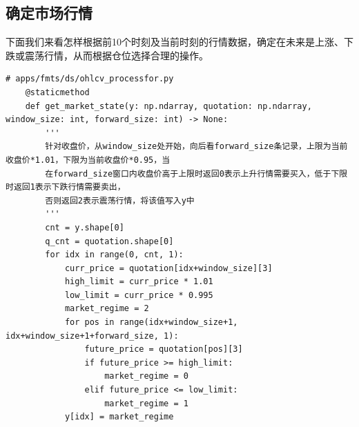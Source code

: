 \subsection{确定市场行情}
下面我们来看怎样根据前10个时刻及当前时刻的行情数据，确定在未来是上涨、下跌或震荡行情，从而根据仓位选择合理的操作。
\begin{lstlisting}
# apps/fmts/ds/ohlcv_processfor.py
    @staticmethod
    def get_market_state(y: np.ndarray, quotation: np.ndarray, window_size: int, forward_size: int) -> None:
        '''
        针对收盘价，从window_size处开始，向后看forward_size条记录，上限为当前收盘价*1.01，下限为当前收盘价*0.95，当
        在forward_size窗口内收盘价高于上限时返回0表示上升行情需要买入，低于下限时返回1表示下跌行情需要卖出，
        否则返回2表示震荡行情，将该值写入y中
        '''
        cnt = y.shape[0]
        q_cnt = quotation.shape[0]
        for idx in range(0, cnt, 1):
            curr_price = quotation[idx+window_size][3]
            high_limit = curr_price * 1.01
            low_limit = curr_price * 0.995
            market_regime = 2
            for pos in range(idx+window_size+1, idx+window_size+1+forward_size, 1):
                future_price = quotation[pos][3]
                if future_price >= high_limit:
                    market_regime = 0
                elif future_price <= low_limit:
                    market_regime = 1
            y[idx] = market_regime



\end{lstlisting}
